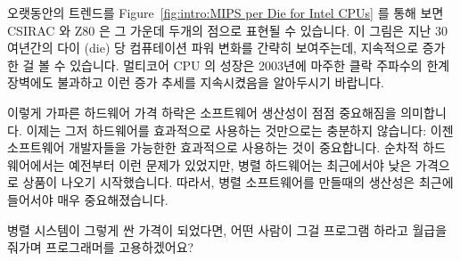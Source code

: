 오랫동안의 트렌드를 Figure~\ref{fig:intro:MIPS per Die for Intel CPUs} 를 통해
보면 CSIRAC 와 Z80 은 그 가운데 두개의 점으로 표현될 수 있습니다.
이 그림은 지난 30여년간의 다이 (die) 당 컴퓨테이션 파워 변화를 간략히
보여주는데, 지속적으로 증가한 걸 볼 수 있습니다.
멀티코어 CPU 의 성장은 2003년에 마주한 클락 주파수의 한계 장벽에도 불과하고
이런 증가 추세를 지속시켰음을 알아두시기 바랍니다.

이렇게 가파른 하드웨어 가격 하락은 소프트웨어 생산성이 점점 중요해짐을
의미합니다.
이제는 그저 하드웨어를 효과적으로 사용하는 것만으로는 충분하지 않습니다:
이젠 소프트웨어 개발자들을 가능한한 효과적으로 사용하는 것이 중요합니다.
순차적 하드웨어에서는 예전부터 이런 문제가 있었지만, 병렬 하드웨어는 최근에서야
낮은 가격으로 상품이 나오기 시작했습니다.
따라서, 병렬 소프트웨어를 만들때의 생산성은 최근에 들어서야 매우
중요해졌습니다.

\QuickQuiz{}
	병렬 시스템이 그렇게 싼 가격이 되었다면, 어떤 사람이 그걸 프로그램
	하라고 월급을 줘가며 프로그래머를 고용하겠어요?
\iffalse

